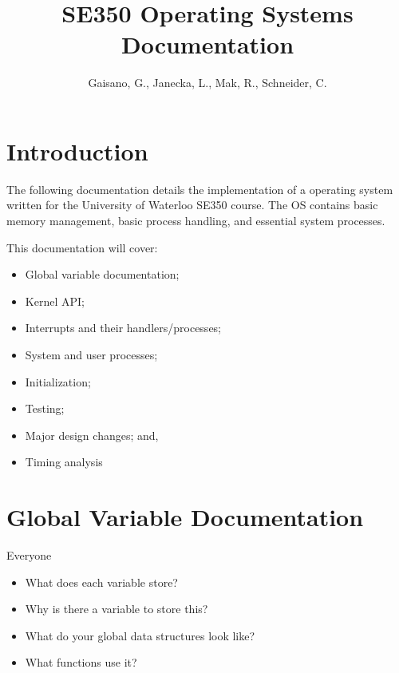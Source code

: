 \documentclass[11pt, oneside]{article}
\title{SE350 Operating Systems Documentation}
\author{Gaisano, G., Janecka, L., Mak, R., Schneider, C.}
\begin{document}
\maketitle

\section{Introduction}
The following documentation details the implementation of a operating system written for the University of Waterloo SE350 course. The OS contains basic memory management, basic process handling, and essential system processes.

This documentation will cover:
\begin{itemize}
\item Global variable documentation;
\item Kernel API;
\item Interrupts and their handlers/processes;
\item System and user processes;
\item Initialization;
\item Testing;
\item Major design changes; and,
\item Timing analysis
\end{itemize}

\clearpage
\section{Global Variable Documentation}
Everyone
\begin{itemize}
\item What does each variable store?
\item Why is there a variable to store this?
\item What do your global data structures look like?
\item What functions use it?
\end{itemize}
\end{document}
